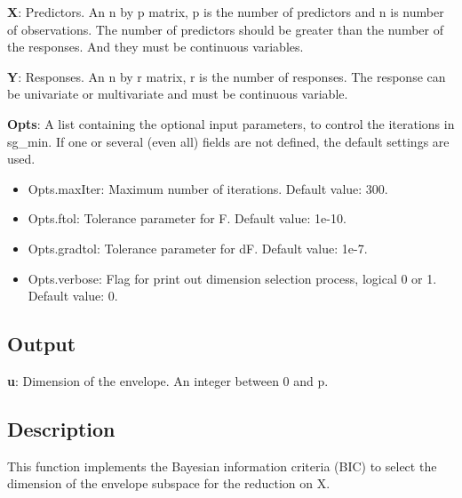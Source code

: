 \documentclass[a4paper,11pt,openany]{memoir}
\begin{document}
\begin{par}
\textbf{X}: Predictors. An n by p matrix, p is the number of predictors and n is number of observations. The number of predictors should be greater than the number of the responses. And they must be continuous variables.
\end{par} \vspace{1em}
\begin{par}
\textbf{Y}: Responses. An n by r matrix, r is the number of responses. The response can be univariate or multivariate and must be continuous variable.
\end{par} \vspace{1em}
\begin{par}
\textbf{Opts}: A list containing the optional input parameters, to control the iterations in sg\_min. If one or several (even all) fields are not defined, the default settings are used.
\end{par} \vspace{1em}
\begin{itemize}
\setlength{\itemsep}{-1ex}
   \item Opts.maxIter: Maximum number of iterations.  Default value: 300.
   \item Opts.ftol: Tolerance parameter for F.  Default value: 1e-10.
   \item Opts.gradtol: Tolerance parameter for dF.  Default value: 1e-7.
   \item Opts.verbose: Flag for print out dimension selection process, logical 0 or 1. Default value: 0.
\end{itemize}


\subsection*{Output}

\begin{par}
\textbf{u}: Dimension of the envelope. An integer between 0 and p.
\end{par} \vspace{1em}


\subsection*{Description}

\begin{par}
This function implements the Bayesian information criteria (BIC) to select the dimension of the envelope subspace for the reduction on X.
\end{par} \vspace{1em}
\end{document}
